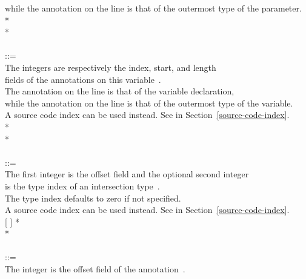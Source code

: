 \documentclass{article}
\begin{document}
\begin{tabbing}
\qquad    \bnfcmt while the annotation on the  line is that of the outermost type of the parameter. \\
\qquad    {}  \bnflit{:} * \lineend \\
\qquad    {}* \\
\\
 ::= \\
\qquad    \bnfcmt The integers are respectively the index, start, and length \\
\qquad    \bnfcmt fields of the annotations on this variable~\cite{JSR308}. \\
\qquad    \bnfcmt The annotation on the  line is that of the variable declaration, \\
\qquad    \bnfcmt while the annotation on the  line is that of the outermost type of the variable. \\
\qquad    \bnfcmt A source code index can be used instead. See  in Section~\ref{source-code-index}. \\
\qquad    {}  \bnflit{\#}  \bnflit{+}  \bnflit{:} * \lineend \\
\qquad    {}* \\
\\
 ::= \\
\qquad    \bnfcmt The first integer is the offset field and the optional second integer\\
\qquad    \bnfcmt is the type index of an intersection type~\cite{JSR308}. \\
\qquad    \bnfcmt The type index defaults to zero if not specified. \\
\qquad    \bnfcmt A source code index can be used instead. See  in Section~\ref{source-code-index}. \\
\qquad    {} \bnflit{\#} 
  [ \bnflit{,}  ] \bnflit{:}
  * \lineend \\
\qquad    {}* \\
\\
 ::= \\
\qquad    \bnfcmt The integer is the offset field of the annotation~\cite{JSR308}. \\

\end{tabbing}
\end{document}
